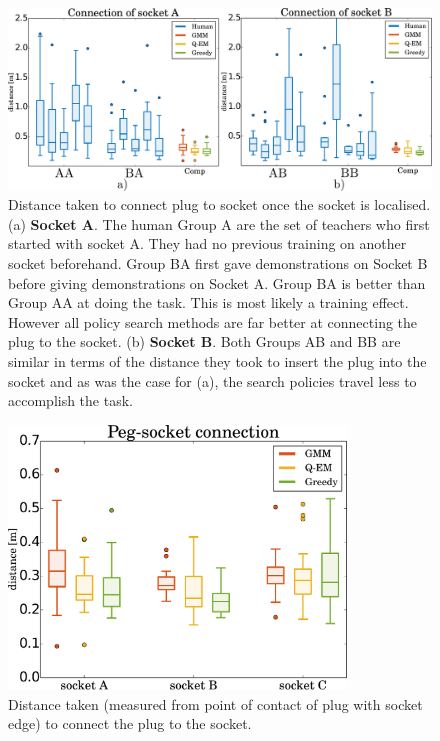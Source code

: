 \documentclass[final,3p,times,twocolumn]{elsarticle}
\begin{document}
\begin{figure}
 \centering
   \includegraphics[width=\textwidth]{./Figures/Results2/real_exp_socketAB.pdf}
  \caption{Distance taken to connect plug to socket once the socket is localised. (a) \textbf{Socket A}. The human 
  Group A are the set of teachers who first started with socket A. They had no previous training on another socket beforehand. Group 
  BA first gave demonstrations on Socket B before giving demonstrations on Socket A. Group BA
  is better than Group AA at doing the task. This is most likely a training effect. However all policy search methods are far better
  at connecting the plug to the socket. (b) \textbf{Socket B}. Both Groups AB and BB are similar in terms 
  of the distance they took to insert the plug into the socket and as was the case for (a), the search policies travel less to accomplish 
  the task.   } 
  \label{fig:real_statistics}
\end{figure}

\begin{figure}
 \centering
   \includegraphics[width=0.8\textwidth]{./Figures/Results2/peg_socket_connection_v2.pdf}
   \caption{Distance taken (measured from point of contact of plug with socket edge) to connect the plug to the socket.}
  \label{fig:real_statistics2}
\end{figure}
\end{document}

